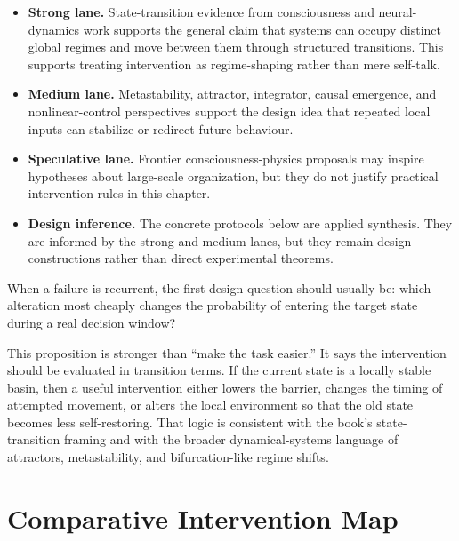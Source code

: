 \begin{itemize}[nosep]
  \item \textbf{Strong lane.} State-transition evidence from consciousness and
        neural-dynamics work supports the general claim that systems can occupy
        distinct global regimes and move between them through structured
        transitions. This supports treating intervention as regime-shaping
        rather than mere self-talk.
  \item \textbf{Medium lane.} Metastability, attractor, integrator, causal
        emergence, and nonlinear-control perspectives support the design idea
        that repeated local inputs can stabilize or redirect future behaviour.
  \item \textbf{Speculative lane.} Frontier consciousness-physics proposals may
        inspire hypotheses about large-scale organization, but they do not
        justify practical intervention rules in this chapter.
  \item \textbf{Design inference.} The concrete protocols below are applied
        synthesis. They are informed by the strong and medium lanes, but they
        remain design constructions rather than direct experimental theorems.
\end{itemize}

\begin{proposition}
When a failure is recurrent, the first design question should usually be:
which alteration most cheaply changes the probability of entering the target
state during a real decision window?
\end{proposition}

\begin{discussion}
This proposition is stronger than ``make the task easier.'' It says the
intervention should be evaluated in transition terms. If the current state is a
locally stable basin, then a useful intervention either lowers the barrier,
changes the timing of attempted movement, or alters the local environment so
that the old state becomes less self-restoring. That logic is consistent with
the book's state-transition framing and with the broader dynamical-systems
language of attractors, metastability, and bifurcation-like regime shifts.
\end{discussion}

\section{Comparative Intervention Map}

